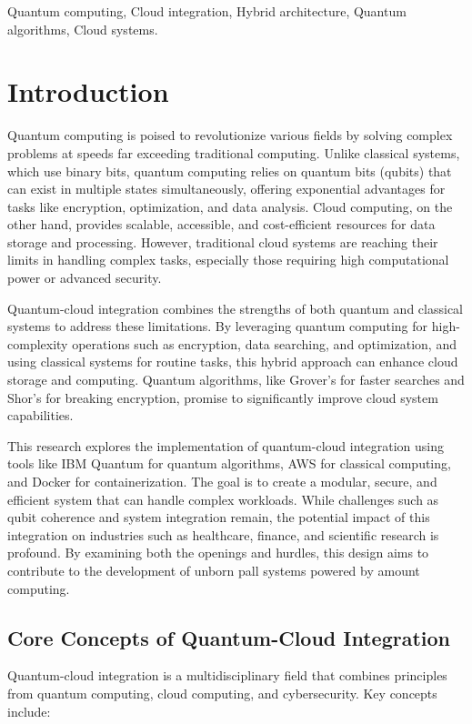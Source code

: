 \documentclass[conference]{IEEEtran}
\begin{document}
\begin{IEEEkeywords}
Quantum computing, Cloud integration, Hybrid architecture, Quantum algorithms, Cloud systems.
\end{IEEEkeywords}

\section{Introduction}
 Quantum computing is poised to revolutionize various fields by solving complex problems at speeds far exceeding traditional computing. Unlike classical systems, which use binary bits, quantum computing relies on quantum bits (qubits) that can exist in multiple states simultaneously, offering exponential advantages for tasks like encryption, optimization, and data analysis. Cloud computing, on the other hand, provides scalable, accessible, and cost-efficient resources for data storage and processing. However, traditional cloud systems are reaching their limits in handling complex tasks, especially those requiring high computational power or advanced security.

    Quantum-cloud integration combines the strengths of both quantum and classical systems to address these limitations. By leveraging quantum computing for high-complexity operations such as encryption, data searching, and optimization, and using classical systems for routine tasks, this hybrid approach can enhance cloud storage and computing. Quantum algorithms, like Grover’s for faster searches and Shor’s for breaking encryption, promise to significantly improve cloud system capabilities.
    
    This research explores the implementation of quantum-cloud integration using tools like IBM Quantum for quantum algorithms, AWS for classical computing, and Docker for containerization. The goal is to create a modular, secure, and efficient system that can handle complex workloads. While challenges such as qubit coherence and system integration remain, the potential impact of this integration on industries such as healthcare, finance, and scientific research is profound. By examining both the openings and hurdles, this design aims to contribute to the development of unborn pall systems powered by amount computing.
    
\subsection{Core Concepts of Quantum-Cloud Integration}
Quantum-cloud integration is a multidisciplinary field that combines principles from quantum computing, cloud computing, and cybersecurity. Key concepts include:
\end{document}

